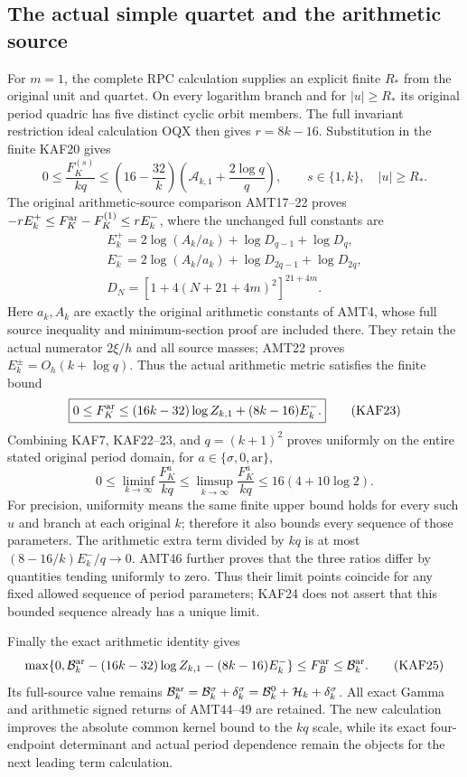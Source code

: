 \documentclass[11pt,a4paper]{article}
\begin{document}
\subsection{The actual simple quartet and the arithmetic source}
For $m=1$, the complete RPC calculation supplies an explicit finite
$R_*$ from the original unit and quartet. On every logarithm branch
and for $|u|\ge R_*$ its original period quadric has five distinct
cyclic orbit members. The full invariant restriction ideal calculation
OQX then gives $r=8k-16$. Substitution in the finite KAF20 gives
\[
 \boxed{0\le\frac{F_K^{(s)}}{kq}
 \le\left(16-\frac{32}{k}\right)
       \left(\mathcal A_{k,1}+\frac{2\log q}{q}\right),
 \qquad s\in\{1,k\},\quad |u|\ge R_*.}\tag{KAF22}
\]
The original arithmetic-source comparison AMT17--22 proves
$-rE_k^+\le F_K^{\rm ar}-F_K^{(1)}\le rE_k^-$, where the
unchanged full constants are
\[
\begin{gathered}
 E_k^+=2\log(A_k/a_k)+\log D_{q-1}+\log D_q,\\
 E_k^-=2\log(A_k/a_k)+\log D_{2q-1}+\log D_{2q},
 \\ D_N=[1+4(N+21+4m)^2]^{21+4m}.
\end{gathered}
\]
Here $a_k,A_k$ are exactly the original arithmetic constants of AMT4,
whose full source inequality and minimum-section proof are included
there. They retain the actual numerator $2\xi/h$ and all source
masses; AMT22 proves $E_k^\pm=O_h(k+\log q)$.
Thus the actual arithmetic metric satisfies the finite bound
\[
 \boxed{0\le F_K^{\rm ar}
       \le(16k-32)\log Z_{k,1}+(8k-16)E_k^-.}\tag{KAF23}
\]
Combining KAF7, KAF22--23, and $q=(k+1)^2$ proves uniformly on
the entire stated original period domain, for
$a\in\{\sigma,0,\mathrm{ar}\}$,
\[
 \boxed{0\le\liminf_{k\to\infty}\frac{F_K^a}{kq}
       \le\limsup_{k\to\infty}\frac{F_K^a}{kq}
       \le16(4+10\log2).}\tag{KAF24}
\]
For precision, uniformity means the same finite upper bound holds for
every such $u$ and branch at each original $k$; therefore it also
bounds every sequence of those parameters. The arithmetic extra term
divided by $kq$ is at most $(8-16/k)E_k^-/q\to0$.
AMT46 further proves that the three ratios differ by quantities
tending uniformly to zero. Thus their limit points coincide for any
fixed allowed sequence of period parameters; KAF24 does not assert
that this bounded sequence already has a unique limit.

Finally the exact arithmetic identity gives
\[
 \max\{0,\mathcal B_k^{\rm ar}-(16k-32)\log Z_{k,1}
                              -(8k-16)E_k^-\}
       \le F_B^{\rm ar}\le\mathcal B_k^{\rm ar}.\tag{KAF25}
\]
Its full-source value remains
$\mathcal B_k^{\rm ar}=\mathcal B_k^\sigma+\delta_k^\sigma
=\mathcal B_k^0+\mathcal H_k+\delta_k^\sigma$.
All exact Gamma and arithmetic signed returns of AMT44--49 are
retained. The new calculation improves the absolute common kernel
bound to the $kq$ scale, while its exact four-endpoint determinant
and actual period dependence remain the objects for the next leading
term calculation.
\end{document}
